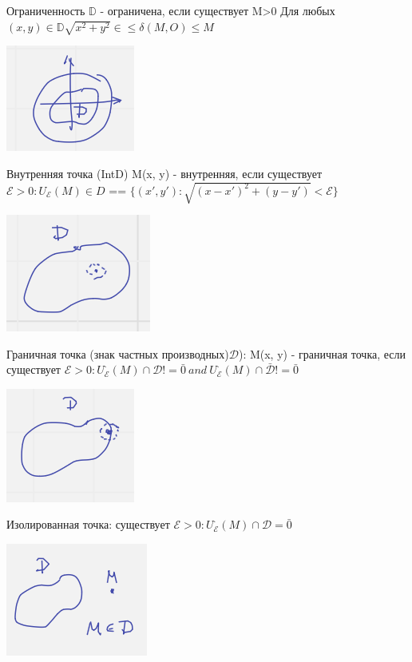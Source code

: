 \documentclass{article}
\begin{document}
Ограниченность $\mathbb{D} $ - ограничена, если существует  M>0 Для любых $(x, y) \in \mathbb{D} \sqrt{x^2+y^2}\in \leq \delta(M, O) \leq M$

\includegraphics[width=.3\textwidth]{1.2} 

Внутренняя точка (IntD) M(x, y) - внутренняя, если существует $\mathcal{E} > 0 : U_{\mathcal{E}}(M) \in D $ == $\{(x', y'): \sqrt{(x-x')^2+(y-y')} < \mathcal{E}\}$

\includegraphics[width=.3\textwidth]{1.3} 

Граничная точка (знак частных производных)$\mathcal{D}$): M(x, y)
- граничная точка, если существует $\mathcal{E} > 0 : U^{\cdot}_{\mathcal{E}}(M) \cap \mathcal{D} != \bar{0}\  and\  U^{\cdot}_{\mathcal{E}}(M) \cap \bar{\mathcal{D}} != \bar{0}$


\includegraphics[width=.3\textwidth]{gran} 


Изолированная точка: существует $\mathcal{E} > 0 : U^{\cdot}_{\mathcal{E}}(M) \cap \mathcal{D} = \bar{0}$

\includegraphics[width=.3\textwidth]{isolate} 
\end{document}
